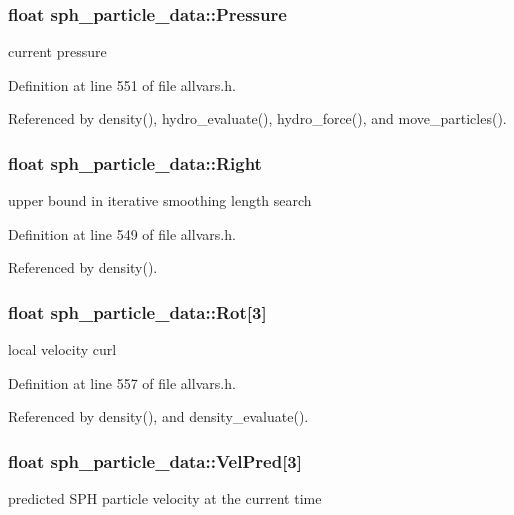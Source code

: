 \hypertarget{structsph__particle__data_a9201a97de5fe06f6ed6fcc33386eccda}{
\subsubsection[{Pressure}]{\setlength{\rightskip}{0pt plus 5cm}float {\bf sph\_\-particle\_\-data::Pressure}}}
\label{structsph__particle__data_a9201a97de5fe06f6ed6fcc33386eccda}
current pressure 

Definition at line 551 of file allvars.h.



Referenced by density(), hydro\_\-evaluate(), hydro\_\-force(), and move\_\-particles().

\hypertarget{structsph__particle__data_ae21f207de0a8a6f53cc891a7556f2592}{
\subsubsection[{Right}]{\setlength{\rightskip}{0pt plus 5cm}float {\bf sph\_\-particle\_\-data::Right}}}
\label{structsph__particle__data_ae21f207de0a8a6f53cc891a7556f2592}
upper bound in iterative smoothing length search 

Definition at line 549 of file allvars.h.



Referenced by density().

\hypertarget{structsph__particle__data_a6b9b7ed346c2d65d50dacd4b43cdd1d2}{
\subsubsection[{Rot}]{\setlength{\rightskip}{0pt plus 5cm}float {\bf sph\_\-particle\_\-data::Rot}\mbox{[}3\mbox{]}}}
\label{structsph__particle__data_a6b9b7ed346c2d65d50dacd4b43cdd1d2}
local velocity curl 

Definition at line 557 of file allvars.h.



Referenced by density(), and density\_\-evaluate().

\hypertarget{structsph__particle__data_a730acdc1da11f80da2214ebb76e6c2b3}{
\subsubsection[{VelPred}]{\setlength{\rightskip}{0pt plus 5cm}float {\bf sph\_\-particle\_\-data::VelPred}\mbox{[}3\mbox{]}}}
\label{structsph__particle__data_a730acdc1da11f80da2214ebb76e6c2b3}
predicted SPH particle velocity at the current time 

